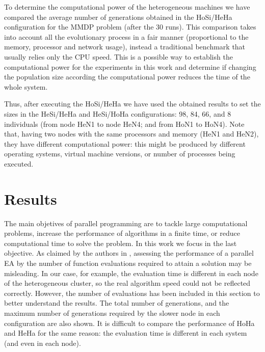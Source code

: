  
To determine the computational power of the heterogeneous machines we have compared the average number of generations obtained in the HoSi/HeHa configuration for the MMDP problem (after the 30 runs). This comparison takes into account all the evolutionary process in a fair manner (proportional to the memory, processor and network usage), instead a traditional benchmark that usually relies only the CPU speed. This is a possible way to establish the computational power for the experiments in this work and determine if changing the population size according the computational power reduces the time of the whole system.

Thus, after executing the HoSi/HeHa we have used the obtained results to set the sizes in the HeSi/HeHa and HeSi/HoHa configurations: 98, 84, 66, and 8 individuals (from node HeN1 to node HeN4; and from HoN1 to HoN4). Note that, having two nodes with the same processors and memory (HeN1 and HeN2), they have different computational power: this might be produced by different operating systems, virtual machine versions, or number of processes being executed.






\section{Results}
\label{sec:results}

The main objetives of parallel programming are to tackle large computational problems, increase the performance of algorithms in a finite time, or reduce computational time to solve the problem. In this work we focus in the last objective.
As claimed by the authors in \cite{EVALUATIONPARALLEL}, assessing the performance of a parallel EA by the number of function evaluations required to attain a solution may be misleading. In our case, for example, the evaluation time is different in each node of the heterogeneous cluster, so the real algorithm speed could not be reflected correctly. However, the number of evaluations has been included in this section to better understand the results. The total number of generations, and the maximum number of generations required by the slower node in each configuration are also shown. It is difficult to compare the performance of HoHa and HeHa for the same reason: the evaluation time is different in each system (and even in each node).

